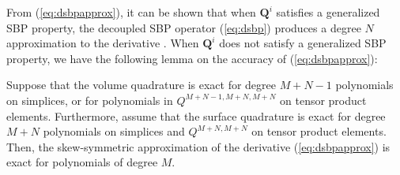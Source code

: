 \documentclass{svjour3}                     %
\begin{document}
From (\ref{eq:dsbpapprox}), it can be shown that when $\bm{Q}^i$ satisfies a generalized SBP property, the decoupled SBP operator (\ref{eq:dsbp}) produces a degree $N$ approximation to the derivative \cite{chan2017discretely}.  When $\bm{Q}^i$ does not satisfy a generalized SBP property, we have the following lemma on the accuracy of (\ref{eq:dsbpapprox}):
\begin{lemma}
Suppose that the volume quadrature is exact for degree $M+N-1$ polynomials on simplices, or for polynomials in $Q^{M+N-1,M+N,M+N}$ on tensor product elements.  Furthermore, assume that the surface quadrature is exact for degree $M+N$ polynomials on simplices and $Q^{M+N,M+N}$ on tensor product elements.  Then, the skew-symmetric approximation of the derivative (\ref{eq:dsbpapprox}) is exact for polynomials of degree $M$.  
\label{lemma:dsbpapprox}
\end{lemma}
\end{document}
